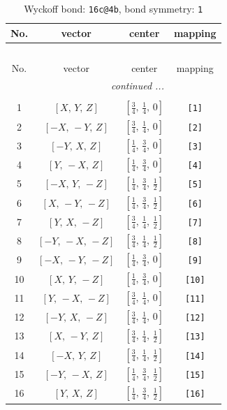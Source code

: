 \documentclass[fleqn,8pt]{jsarticle}
\begin{document}
\begin{longtable}{cccc}
\caption{Wyckoff bond: {\tt 16c@4b}, bond symmetry: {\tt 1}}
 \\
 \hline \hline
No. & vector & center & mapping \\ \hline \endfirsthead

\multicolumn{3}{l}{\tablename\ \thetable{}} \\
 \hline \hline
No. & vector & center & mapping \\ \hline \endhead

 \hline \hline
\multicolumn{3}{r}{\footnotesize\it continued ...} \\ \endfoot

 \hline \hline
\multicolumn{3}{r}{} \\ \endlastfoot

1 & $\left[ X,\, Y,\, Z \right]$ & $\left[ \frac{3}{4},\, \frac{1}{4},\, 0 \right]$ & {\tt [1]} \\ \hline
2 & $\left[ - X,\, - Y,\, Z \right]$ & $\left[ \frac{3}{4},\, \frac{1}{4},\, 0 \right]$ & {\tt [2]} \\ \hline
3 & $\left[ - Y,\, X,\, Z \right]$ & $\left[ \frac{1}{4},\, \frac{3}{4},\, 0 \right]$ & {\tt [3]} \\ \hline
4 & $\left[ Y,\, - X,\, Z \right]$ & $\left[ \frac{1}{4},\, \frac{3}{4},\, 0 \right]$ & {\tt [4]} \\ \hline
5 & $\left[ - X,\, Y,\, - Z \right]$ & $\left[ \frac{1}{4},\, \frac{3}{4},\, \frac{1}{2} \right]$ & {\tt [5]} \\ \hline
6 & $\left[ X,\, - Y,\, - Z \right]$ & $\left[ \frac{1}{4},\, \frac{3}{4},\, \frac{1}{2} \right]$ & {\tt [6]} \\ \hline
7 & $\left[ Y,\, X,\, - Z \right]$ & $\left[ \frac{3}{4},\, \frac{1}{4},\, \frac{1}{2} \right]$ & {\tt [7]} \\ \hline
8 & $\left[ - Y,\, - X,\, - Z \right]$ & $\left[ \frac{3}{4},\, \frac{1}{4},\, \frac{1}{2} \right]$ & {\tt [8]} \\ \hline
9 & $\left[ - X,\, - Y,\, - Z \right]$ & $\left[ \frac{1}{4},\, \frac{3}{4},\, 0 \right]$ & {\tt [9]} \\ \hline
10 & $\left[ X,\, Y,\, - Z \right]$ & $\left[ \frac{1}{4},\, \frac{3}{4},\, 0 \right]$ & {\tt [10]} \\ \hline
11 & $\left[ Y,\, - X,\, - Z \right]$ & $\left[ \frac{3}{4},\, \frac{1}{4},\, 0 \right]$ & {\tt [11]} \\ \hline
12 & $\left[ - Y,\, X,\, - Z \right]$ & $\left[ \frac{3}{4},\, \frac{1}{4},\, 0 \right]$ & {\tt [12]} \\ \hline
13 & $\left[ X,\, - Y,\, Z \right]$ & $\left[ \frac{3}{4},\, \frac{1}{4},\, \frac{1}{2} \right]$ & {\tt [13]} \\ \hline
14 & $\left[ - X,\, Y,\, Z \right]$ & $\left[ \frac{3}{4},\, \frac{1}{4},\, \frac{1}{2} \right]$ & {\tt [14]} \\ \hline
15 & $\left[ - Y,\, - X,\, Z \right]$ & $\left[ \frac{1}{4},\, \frac{3}{4},\, \frac{1}{2} \right]$ & {\tt [15]} \\ \hline
16 & $\left[ Y,\, X,\, Z \right]$ & $\left[ \frac{1}{4},\, \frac{3}{4},\, \frac{1}{2} \right]$ & {\tt [16]} \\
\end{longtable}
\end{document}
